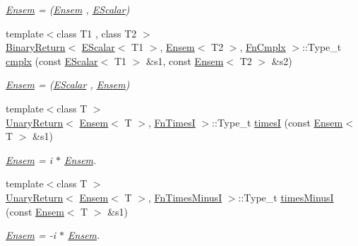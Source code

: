 \begin{DoxyCompactItemize}
\begin{DoxyCompactList}\small\item\em \mbox{\hyperlink{classENSEM_1_1Ensem}{Ensem}} = (\mbox{\hyperlink{classENSEM_1_1Ensem}{Ensem}} , \mbox{\hyperlink{classENSEM_1_1EScalar}{E\+Scalar}}) \end{DoxyCompactList}\item 
{\footnotesize template$<$class T1 , class T2 $>$ }\\\mbox{\hyperlink{structENSEM_1_1BinaryReturn}{Binary\+Return}}$<$ \mbox{\hyperlink{classENSEM_1_1EScalar}{E\+Scalar}}$<$ T1 $>$, \mbox{\hyperlink{classENSEM_1_1Ensem}{Ensem}}$<$ T2 $>$, \mbox{\hyperlink{structENSEM_1_1FnCmplx}{Fn\+Cmplx}} $>$\+::Type\+\_\+t \mbox{\hyperlink{group__eensem_gae141b1babc25cfea8bcda2218aea5125}{cmplx}} (const \mbox{\hyperlink{classENSEM_1_1EScalar}{E\+Scalar}}$<$ T1 $>$ \&s1, const \mbox{\hyperlink{classENSEM_1_1Ensem}{Ensem}}$<$ T2 $>$ \&s2)
\begin{DoxyCompactList}\small\item\em \mbox{\hyperlink{classENSEM_1_1Ensem}{Ensem}} = (\mbox{\hyperlink{classENSEM_1_1EScalar}{E\+Scalar}} , \mbox{\hyperlink{classENSEM_1_1Ensem}{Ensem}}) \end{DoxyCompactList}\item 
{\footnotesize template$<$class T $>$ }\\\mbox{\hyperlink{structENSEM_1_1UnaryReturn}{Unary\+Return}}$<$ \mbox{\hyperlink{classENSEM_1_1Ensem}{Ensem}}$<$ T $>$, \mbox{\hyperlink{structENSEM_1_1FnTimesI}{Fn\+TimesI}} $>$\+::Type\+\_\+t \mbox{\hyperlink{group__eensem_ga3fc5873019ba3366e2e3fd6cad8632bd}{timesI}} (const \mbox{\hyperlink{classENSEM_1_1Ensem}{Ensem}}$<$ T $>$ \&s1)
\begin{DoxyCompactList}\small\item\em \mbox{\hyperlink{classENSEM_1_1Ensem}{Ensem}} = i $\ast$ \mbox{\hyperlink{classENSEM_1_1Ensem}{Ensem}}. \end{DoxyCompactList}\item 
{\footnotesize template$<$class T $>$ }\\\mbox{\hyperlink{structENSEM_1_1UnaryReturn}{Unary\+Return}}$<$ \mbox{\hyperlink{classENSEM_1_1Ensem}{Ensem}}$<$ T $>$, \mbox{\hyperlink{structENSEM_1_1FnTimesMinusI}{Fn\+Times\+MinusI}} $>$\+::Type\+\_\+t \mbox{\hyperlink{group__eensem_ga405bf45509ebc2aed7e0bc4423e24849}{times\+MinusI}} (const \mbox{\hyperlink{classENSEM_1_1Ensem}{Ensem}}$<$ T $>$ \&s1)
\begin{DoxyCompactList}\small\item\em \mbox{\hyperlink{classENSEM_1_1Ensem}{Ensem}} = -\/i $\ast$ \mbox{\hyperlink{classENSEM_1_1Ensem}{Ensem}}. \end{DoxyCompactList}\item 

\end{DoxyCompactItemize}
